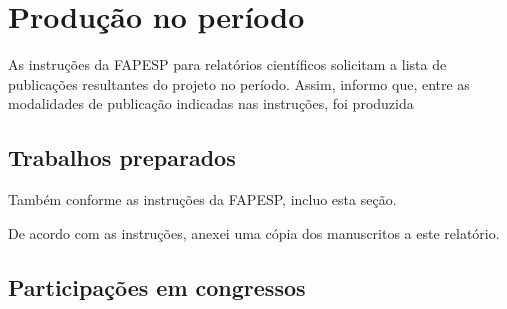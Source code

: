 \section{Produção no período} %
As instruções da FAPESP para relatórios científicos solicitam a lista de publicações resultantes do projeto no período.
Assim, informo que, entre as modalidades de publicação indicadas nas instruções, foi produzida 


\subsection{Trabalhos preparados} %
Também conforme as instruções da FAPESP, incluo esta seção. 


De acordo com as instruções, anexei uma cópia dos manuscritos a este relatório.

\subsection{Participações em congressos} %

